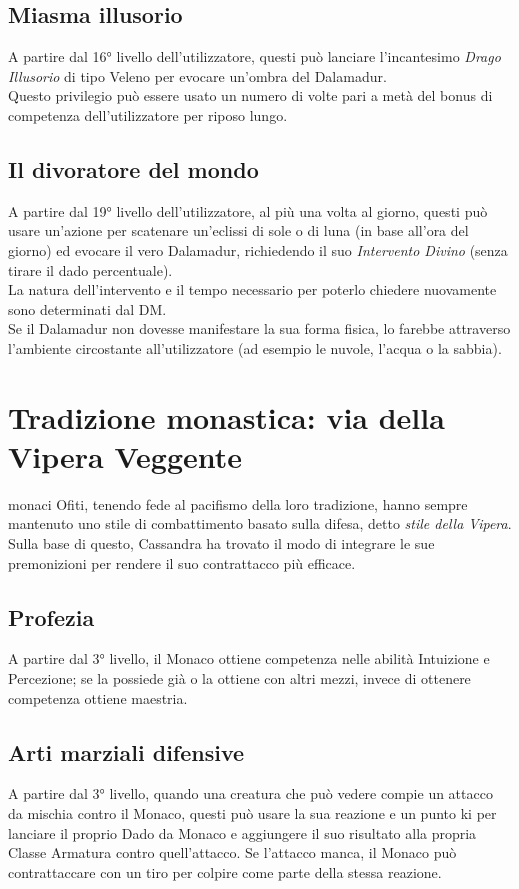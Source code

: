 \documentclass[letterpaper,twocolumn,openany,nodeprecatedcode]{dndbook}
\begin{document}
\subsection{Miasma illusorio}
A partire dal 16° livello dell'utilizzatore, questi può lanciare l'incantesimo \textit{Drago Illusorio} di tipo Veleno per evocare un'ombra del Dalamadur.\\
Questo privilegio può essere usato un numero di volte pari a metà del bonus di competenza dell'utilizzatore per riposo lungo.

\subsection{Il divoratore del mondo}
A partire dal 19° livello dell'utilizzatore, al più una volta al giorno, questi può usare un'azione per scatenare un'eclissi di sole o di luna (in base all'ora del giorno) ed evocare il vero Dalamadur, richiedendo il suo \textit{Intervento Divino} (senza tirare il dado percentuale).\\
La natura dell'intervento e il tempo necessario per poterlo chiedere nuovamente sono determinati dal DM.\\
Se il Dalamadur non dovesse manifestare la sua forma fisica, lo farebbe attraverso l'ambiente circostante all'utilizzatore (ad esempio le nuvole, l'acqua o la sabbia).

\section{Tradizione monastica: via della Vipera Veggente}
 monaci Ofiti, tenendo fede al pacifismo della loro tradizione, hanno sempre mantenuto uno stile di combattimento basato sulla difesa, detto \textit{stile della Vipera}. Sulla base di questo, Cassandra ha trovato il modo di integrare le sue premonizioni per rendere il suo contrattacco più efficace.

\subsection{Profezia}
A partire dal 3° livello, il Monaco ottiene competenza nelle abilità Intuizione e Percezione; se la possiede già o la ottiene con altri mezzi, invece di ottenere competenza ottiene maestria.

\subsection{Arti marziali difensive}
A partire dal 3° livello, quando una creatura che può vedere compie un attacco da mischia contro il Monaco, questi può usare la sua reazione e un punto ki per lanciare il proprio Dado da Monaco e aggiungere il suo risultato alla propria Classe Armatura contro quell'attacco. Se l'attacco manca, il Monaco può contrattaccare con un tiro per colpire come parte della stessa reazione.
\end{document}
